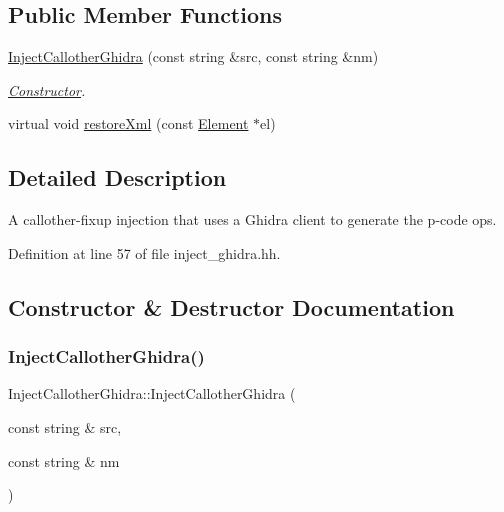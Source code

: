 \subsection*{Public Member Functions}
\begin{DoxyCompactItemize}
\item 
\mbox{\hyperlink{class_inject_callother_ghidra_a101edb421169e4c38d75479398dc6984}{Inject\+Callother\+Ghidra}} (const string \&src, const string \&nm)
\begin{DoxyCompactList}\small\item\em \mbox{\hyperlink{class_constructor}{Constructor}}. \end{DoxyCompactList}\item 
virtual void \mbox{\hyperlink{class_inject_callother_ghidra_a2b2c94c0e13627b5b0eeaa54d52aaeee}{restore\+Xml}} (const \mbox{\hyperlink{class_element}{Element}} $\ast$el)
\end{DoxyCompactItemize}


\subsection{Detailed Description}
A callother-\/fixup injection that uses a Ghidra client to generate the p-\/code ops. 

Definition at line 57 of file inject\+\_\+ghidra.\+hh.



\subsection{Constructor \& Destructor Documentation}
\mbox{\label{class_inject_callother_ghidra_a101edb421169e4c38d75479398dc6984}} 
\subsubsection{\texorpdfstring{InjectCallotherGhidra()}{InjectCallotherGhidra()}}
{\footnotesize\ttfamily Inject\+Callother\+Ghidra\+::\+Inject\+Callother\+Ghidra (\begin{DoxyParamCaption}\item[{const string \&}]{src,  }\item[{const string \&}]{nm }\end{DoxyParamCaption})}



